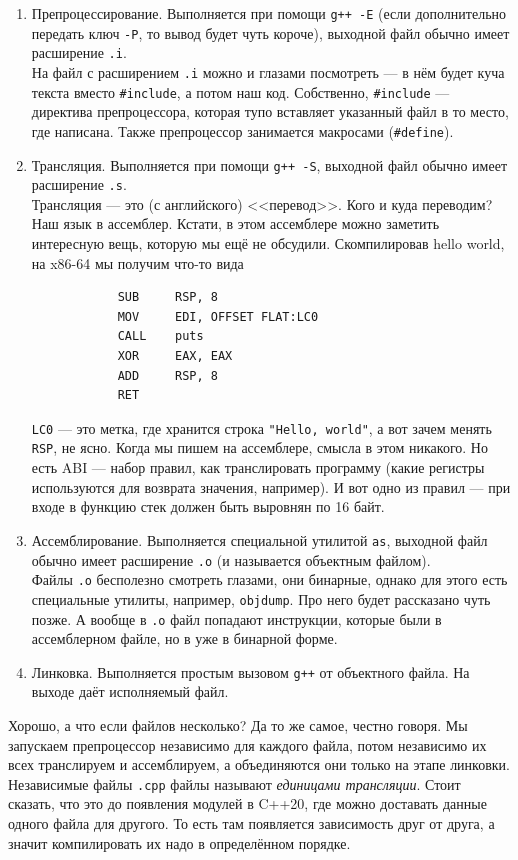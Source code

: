 \documentclass{article}
\newcommand{\asm}[1]{\texttt{#1}}
\begin{document}
    \begin{enumerate}
        \item Препроцессирование. Выполняется при помощи \texttt{g++ -E} (если дополнительно передать ключ \texttt{-P}, то вывод будет чуть короче), выходной файл обычно имеет расширение \texttt{.i}.\\
        На файл с расширением \texttt{.i} можно и глазами посмотреть --- в нём будет куча текста вместо \texttt{#include}, а потом наш код. Собственно, \texttt{#include} --- директива препроцессора, которая тупо вставляет указанный файл в то место, где написана. Также препроцессор занимается макросами (\texttt{#define}).
        \item Трансляция. Выполняется при помощи \texttt{g++ -S}, выходной файл обычно имеет расширение \texttt{.s}.\\
        Трансляция --- это (с английского) <<перевод>>. Кого и куда переводим? Наш язык в ассемблер. Кстати, в этом ассемблере можно заметить интересную вещь, которую мы ещё не обсудили. Скомпилировав hello world, на x86-64 мы получим что-то вида
        \begin{verbatim}
            SUB     RSP, 8
            MOV     EDI, OFFSET FLAT:LC0
            CALL    puts
            XOR     EAX, EAX
            ADD     RSP, 8
            RET
        \end{verbatim}
        \asm{LC0} --- это метка, где хранится строка \texttt{"Hello, world"}, а вот зачем менять \asm{RSP}, не ясно. Когда мы пишем на ассемблере, смысла в этом никакого. Но есть ABI --- набор правил, как транслировать программу (какие регистры используются для возврата значения, например). И вот одно из правил --- при входе в функцию стек должен быть выровнян по 16 байт.
        \item Ассемблирование. Выполняется специальной утилитой \texttt{as}, выходной файл обычно имеет расширение \texttt{.o} (и называется объектным файлом).\\
        Файлы \texttt{.o} бесполезно смотреть глазами, они бинарные, однако для этого есть специальные утилиты, например, \texttt{objdump}. Про него будет рассказано чуть позже. А вообще в \texttt{.o} файл попадают инструкции, которые были в ассемблерном файле, но в уже в бинарной форме.
        \item Линковка. Выполняется простым вызовом \texttt{g++} от объектного файла. На выходе даёт исполняемый файл.
    \end{enumerate}
    Хорошо, а что если файлов несколько? Да то же самое, честно говоря. Мы запускаем препроцессор независимо для каждого файла, потом независимо их всех транслируем и ассемблируем, а объединяются они только на этапе линковки. Независимые файлы \texttt{.cpp} файлы называют \textit{единицами трансляции}. Стоит сказать, что это до появления модулей в C++20, где можно доставать данные одного файла для другого. То есть там появляется зависимость друг от друга, а значит компилировать их надо в определённом порядке.
\end{document}
